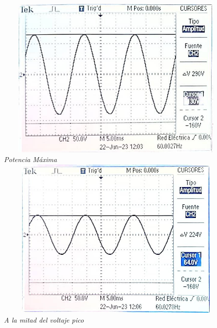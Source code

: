 \documentclass[12pt]{article}
\begin{document}
	\begin{center}
		\includegraphics[width=12cm,height=8cm]{Img/resul_22_1}\\
		\textit{Potencia Máxima}\\
		\vspace{2cm}
		\includegraphics[width=12cm,height=8cm]{Img/resul_22_2}\\
		\textit{A la mitad del voltaje pico}
	\end{center}
\end{document}
